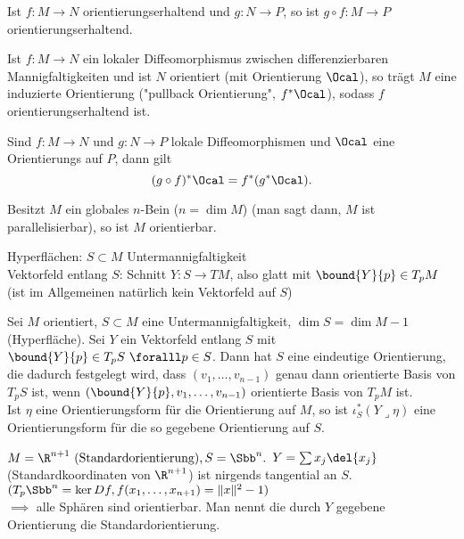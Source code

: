 \begin{rem*}
	Ist \( f: M \to N \) orientierungserhaltend und \( g: N \to P \), so ist \( g \circ f: M \to P \) orientierungserhaltend.
\end{rem*}

\begin{lem}
	Ist \( f:M \to N \) ein lokaler Diffeomorphismus zwischen differenzierbaren Mannigfaltigkeiten und ist $N$ orientiert (mit Orientierung $\Ocal$), so trägt $M$ eine induzierte Orientierung ("pullback Orientierung", $f^*\Ocal$), sodass $f$ orientierungserhaltend ist.
\end{lem}

\begin{rem}
	Sind $f:M \to N$ und $g: N \to P$ lokale Diffeomorphismen und $\Ocal$ eine Orientierungs auf $P$, dann gilt
	\[ (g\circ f) ^* \Ocal = f^*(g^*\Ocal). \]
\end{rem}

\begin{lem}
	Besitzt $M$ ein globales $n$-Bein ($n = \dim M$) (man sagt dann, $M$ ist parallelisierbar), so ist $M$ orientierbar.
\end{lem}

\noindent Hyperflächen: \( S \subset M \) Untermannigfaltigkeit\\
Vektorfeld entlang $S$: Schnitt \( Y: S \to TM \), also glatt mit \( \bound{Y}{p} \in T_pM \) (ist im Allgemeinen natürlich kein Vektorfeld auf $S$)

\begin{lem}\label{8.14}
	Sei $M$ orientiert, \( S \subset M \) eine Untermannigfaltigkeit, \( \dim S = \dim M - 1 \) (Hyperfläche). Sei \( Y \) ein Vektorfeld entlang $S$ mit \( \bound{Y}{p} \in T_pS\ \foralll p \in S \). Dann hat $S$ eine eindeutige Orientierung, die dadurch festgelegt wird, dass \( (v_1, \dotsc, v_{n-1}) \) genau dann orientierte Basis von $T_pS$ ist, wenn \( (\bound{Y}{p},v_1,\dotsc,v_{n-1}) \) orientierte Basis von $T_pM$ ist.\\
	Ist $\eta$ eine Orientierungsform für die Orientierung auf $M$, so ist \( \iota_S^*(Y \lrcorner \eta) \) eine Orientierungsform für die so gegebene Orientierung auf $S$.
\end{lem}

\begin{exmp*}
\end{exmp*}

\begin{exmp*}
	\( M = \R^{n+1} \ (\text{Standardorientierung}), S = \Sbb^n. \) \( Y = \sum x_j \del{x_j} \) (Standardkoordinaten von $\R^{n+1}$) ist nirgends tangential an $S$.\\
	\( ( T_p\Sbb^n = \ker Df, f(x_1,\dotsc,x_{n+1}) = \|x\|^2-1) \)\\
	$\implies$ alle Sphären sind orientierbar. Man nennt die durch $Y$ gegebene Orientierung die Standardorientierung.
\end{exmp*}

